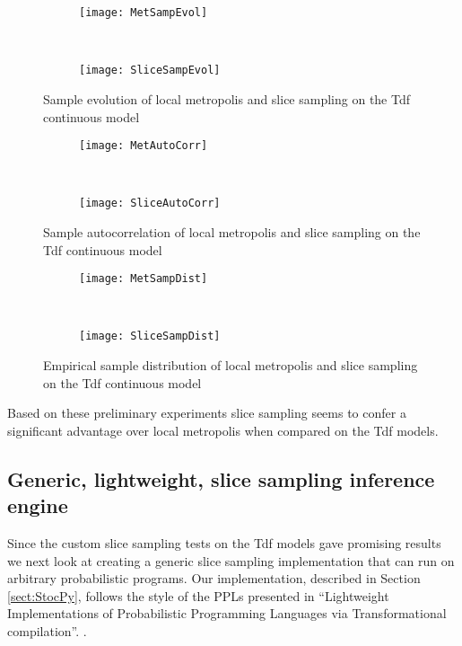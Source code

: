 \begin{figure}[h]
    \centering
    \begin{subfigure}[t]{0.48\textwidth}
      \texttt{[image: MetSampEvol]}
    \end{subfigure}
    ~
    \begin{subfigure}[t]{0.48\textwidth}
      \texttt{[image: SliceSampEvol]}
    \end{subfigure}
    \caption{Sample evolution of local metropolis and slice sampling on the Tdf continuous model}
    \label{fig:custSampEvol}
\end{figure}

\begin{figure}[h]
    \centering
    \begin{subfigure}[t]{0.48\textwidth}
      \texttt{[image: MetAutoCorr]}
    \end{subfigure}
    ~
    \begin{subfigure}[t]{0.48\textwidth}
      \texttt{[image: SliceAutoCorr]}
    \end{subfigure}
    \caption{Sample autocorrelation of local metropolis and slice sampling on the Tdf continuous model}
    \label{fig:custAutoCorr}
\end{figure}

\begin{figure}[H]
    \centering
    \begin{subfigure}[t]{0.48\textwidth}
      \texttt{[image: MetSampDist]}
    \end{subfigure}
    ~
    \begin{subfigure}[t]{0.48\textwidth}
      \texttt{[image: SliceSampDist]}
    \end{subfigure}
    \caption{Empirical sample distribution of local metropolis and slice sampling on the Tdf continuous model}
    \label{fig:custSampDist}
\end{figure}

Based on these preliminary experiments slice sampling seems to confer a significant advantage over local metropolis when compared on the Tdf models.

\subsection{Generic, lightweight, slice sampling inference engine}

Since the custom slice sampling tests on the Tdf models gave promising results we next look at creating a generic slice sampling implementation that can run on arbitrary probabilistic programs. Our implementation, described in Section \ref{sect:StocPy}, follows the style of the PPLs presented in ``Lightweight Implementations of Probabilistic Programming Languages via Transformational compilation''. . 

